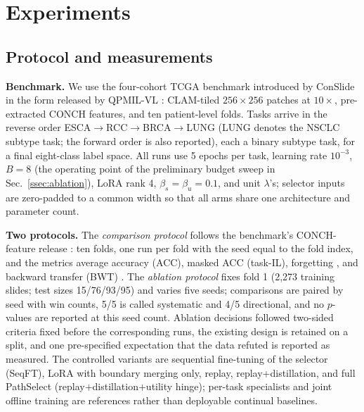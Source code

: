 \documentclass{article}
\begin{document}
\section{Experiments}
\label{sec:exp}

\subsection{Protocol and measurements}

\textbf{Benchmark.}
We use the four-cohort TCGA benchmark introduced by ConSlide \cite{huang2023conslide} in the form released by QPMIL-VL \cite{gou2025qpmil}: CLAM-tiled $256\times256$ patches at $10\times$, pre-extracted CONCH features, and ten patient-level folds. Tasks arrive in the reverse order ESCA$\rightarrow$RCC$\rightarrow$BRCA$\rightarrow$LUNG (LUNG denotes the NSCLC subtype task; the forward order is also reported), each a binary subtype task, for a final eight-class label space. All runs use 5 epochs per task, learning rate $10^{-3}$, $B=8$ (the operating point of the preliminary budget sweep in Sec.~\ref{ssec:ablation}), LoRA rank 4, $\beta_s{=}\beta_u{=}0.1$, and unit $\lambda$'s; selector inputs are zero-padded to a common width so that all arms share one architecture and parameter count.

\textbf{Two protocols.}
The \emph{comparison protocol} follows the benchmark's CONCH-feature release \cite{gou2025qpmil}: ten folds, one run per fold with the seed equal to the fold index, and the metrics average accuracy (ACC), masked ACC (task-IL), forgetting \cite{chaudhry2018rwalk}, and backward transfer (BWT) \cite{lopezpaz2017gem}. The \emph{ablation protocol} fixes fold 1 (2,273 training slides; test sizes 15/76/93/95) and varies five seeds; comparisons are paired by seed with win counts, 5/5 is called systematic and 4/5 directional, and no $p$-values are reported at this seed count. Ablation decisions followed two-sided criteria fixed before the corresponding runs, the existing design is retained on a split, and one pre-specified expectation that the data refuted is reported as measured. The controlled variants are sequential fine-tuning of the selector (SeqFT), LoRA with boundary merging only, replay, replay+distillation, and full PathSelect (replay+distillation+utility hinge); per-task specialists and joint offline training are references rather than deployable continual baselines.
\end{document}
